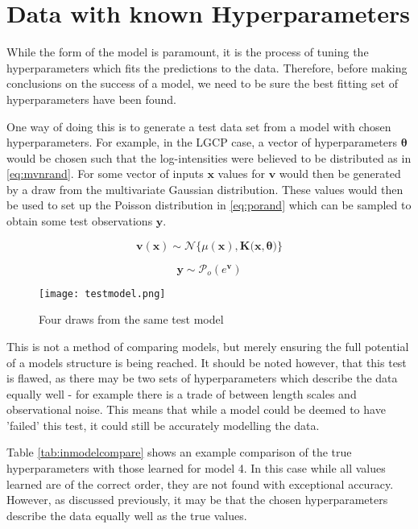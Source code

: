 \documentclass[a4paper,11pt]{report}
\begin{document}
\section{Data with known Hyperparameters}

While the form of the model is paramount, it is the process of tuning the hyperparameters which fits the predictions to the data. Therefore, before making conclusions on the success of a model, we need to be sure the best fitting set of hyperparameters have been found.

One way of doing this is to generate a test data set from a model with chosen hyperparameters. For example, in the LGCP case, a vector of hyperparameters \(\boldsymbol{\theta}\) would be chosen such that the log-intensities were believed to be distributed as in \ref{eq:mvnrand}. For some vector of inputs \(\mathbf{x}\) values for \(\mathbf{v}\) would then be generated by a draw from the multivariate Gaussian distribution. These values would then be used to set up the Poisson distribution in \ref{eq:porand} which can be sampled to obtain some test observations \(\mathbf{y}\).

\singlespacing
\begin{equation} \label{eq:mvnrand}
\mathbf{v(x)} \sim \mathcal{N}\{\mu(\mathbf{x}), \mathbf{K(x},\boldsymbol{\theta})\}
\end{equation}

\begin{equation} \label{eq:porand}
\mathbf{y} \sim \mathcal{P}_o (e^{\mathbf{v}})
\end{equation}
\doublespacing


\begin{figure}
\centering
\texttt{[image: testmodel.png]}
\caption{Four draws from the same test model}
\label{fig:testmodel}
\end{figure}

This is not a method of comparing models, but merely ensuring the full potential of a models structure is being reached. It should be noted however, that this test is flawed, as there may be two sets of hyperparameters which describe the data equally well - for example there is a trade of between length scales and observational noise. This means that while a model could be deemed to have 'failed' this test, it could still be accurately modelling the data. \par

Table \ref{tab:inmodelcompare} shows an example comparison of the true hyperparameters with those learned for model 4. In this case while all values learned are of the correct order, they are not found with exceptional accuracy. However, as discussed previously, it may be that the chosen hyperparameters describe the data equally well as the true values.
\end{document}
